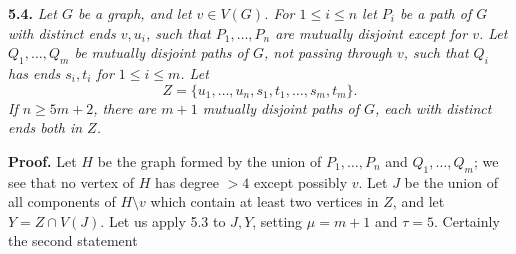 \textbf{5.4.} \textit{Let $G$ be a graph, and let $v \in V(G)$. For $1 \le i \le n$ let $P_i$ be a path of $G$ with distinct ends $v, u_i$, such that $P_1, \dots, P_n$ are mutually disjoint except for $v$. Let $Q_1, \dots, Q_m$ be mutually disjoint paths of $G$, not passing through $v$, such that $Q_i$ has ends $s_i, t_i$ for $1 \le i \le m$. Let}
\begin{equation*}
Z = \{u_1, \dots, u_n, s_1, t_1, \dots, s_m, t_m\}.
\end{equation*}
\textit{If $n \ge 5m + 2$, there are $m + 1$ mutually disjoint paths of $G$, each with distinct ends both in $Z$.}

\textbf{Proof.} Let $H$ be the graph formed by the union of $P_1, \dots, P_n$ and $Q_1, \dots, Q_m$; we see that no vertex of $H$ has degree $> 4$ except possibly $v$. Let $J$ be the union of all components of $H \setminus v$ which contain at least two vertices in $Z$, and let $Y = Z \cap V(J)$. Let us apply 5.3 to $J, Y$, setting $\mu = m + 1$ and $\tau = 5$. Certainly the second statement
